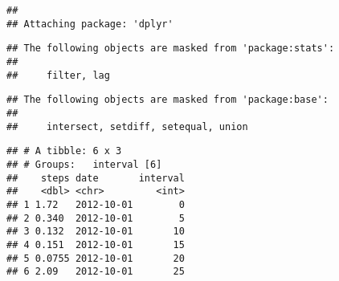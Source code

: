 \documentclass[
]{article}
\newenvironment{Shaded}{\begin{snugshade}}{\end{snugshade}}
\newcommand{\CommentTok}[1]{\textcolor[rgb]{0.56,0.35,0.01}{\textit{#1}}}
\newcommand{\ControlFlowTok}[1]{\textcolor[rgb]{0.13,0.29,0.53}{\textbf{#1}}}
\newcommand{\DataTypeTok}[1]{\textcolor[rgb]{0.13,0.29,0.53}{#1}}
\newcommand{\DecValTok}[1]{\textcolor[rgb]{0.00,0.00,0.81}{#1}}
\newcommand{\KeywordTok}[1]{\textcolor[rgb]{0.13,0.29,0.53}{\textbf{#1}}}
\newcommand{\NormalTok}[1]{#1}
\newcommand{\OperatorTok}[1]{\textcolor[rgb]{0.81,0.36,0.00}{\textbf{#1}}}
\newcommand{\OtherTok}[1]{\textcolor[rgb]{0.56,0.35,0.01}{#1}}
\newcommand{\StringTok}[1]{\textcolor[rgb]{0.31,0.60,0.02}{#1}}
\begin{document}
\begin{verbatim}
## 
## Attaching package: 'dplyr'
\end{verbatim}

\begin{verbatim}
## The following objects are masked from 'package:stats':
## 
##     filter, lag
\end{verbatim}

\begin{verbatim}
## The following objects are masked from 'package:base':
## 
##     intersect, setdiff, setequal, union
\end{verbatim}

\begin{Shaded}
\end{Shaded}

\begin{verbatim}
## # A tibble: 6 x 3
## # Groups:   interval [6]
##    steps date       interval
##    <dbl> <chr>         <int>
## 1 1.72   2012-10-01        0
## 2 0.340  2012-10-01        5
## 3 0.132  2012-10-01       10
## 4 0.151  2012-10-01       15
## 5 0.0755 2012-10-01       20
## 6 2.09   2012-10-01       25
\end{verbatim}

\begin{Shaded}
\end{Shaded}
\end{document}
